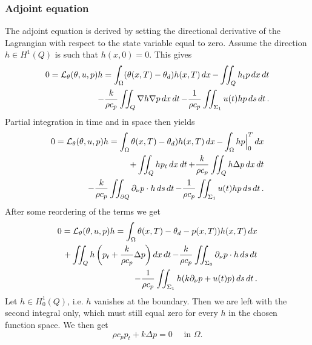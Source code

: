 \subsubsection{Adjoint equation}
The adjoint equation is derived by setting the directional derivative of the Lagrangian with respect to the state variable equal to zero. Assume the direction $h\in H^1(Q)$ is such that $h(x, 0) = 0$. %
This gives
\begin{equation}
  \begin{aligned}
  0 = \mathcal{L}_\theta(\theta, u, p)h = \int_\Omega (\theta(x,T) - \theta_d)h(x, T)\mathop{dx} - \iint_Q h_t p\mathop{dx}\mathop{dt} \\
  - \frac{k}{\rho c_p}\iint_Q\nabla h\nabla p \mathop{dx}\mathop{dt}
  - \frac{1}{\rho c_p}\iint_{\Sigma_1} u(t)h p\mathop{ds}\mathop{dt}.
  \end{aligned}
\end{equation}
Partial integration in time and in space then yields
\begin{equation} %
  \begin{aligned}
  0 = \L_\theta(\theta, u, p)h = \int_\Omega \theta(x,T) - \theta_d)h(x, T)\dx - \int_\Omega hp\Big|_0^T \dx \\
  + \iint_Q h p_t\dxdt
  + \frac{k}{\rho c_p}\iint_Q h\Delta p \dxdt \\
  - \frac{k}{\rho c_p} \iint_{\partial Q}\partial_\nu p\cdot h\dsdt
  - \frac{1}{\rho c_p}\iint_{\Sigma_1} u(t)h p\dsdt.
  \end{aligned}
\end{equation}
After some reordering of the terms we get
\begin{equation}
  \begin{aligned}
  0 = \mathcal{L}_\theta(\theta, u, p)h = \int_\Omega \theta(x,T) - \theta_d-p(x, T))h(x, T)\mathop{dx} \\
  + \iint_Q h \left( p_t + \frac{k}{\rho c_p}\Delta p\right) \mathop{dx}\mathop{dt}
   - \frac{k}{\rho c_p} \iint_{\Sigma_0}\partial_\nu p\cdot h\mathop{ds}\mathop{dt} \\
   - \frac{1}{\rho c_p} \iint_{\Sigma_1}h(  k\partial_\nu p + u(t)p )\mathop{ds}\mathop{dt}.
  \end{aligned}
\end{equation}
Let $h\in H_0^1(Q)$, i.e. $h$ vanishes at the boundary. Then we are left with the second integral only, which must still equal zero for every $h$ in the chosen function space. We then get
\begin{equation*}
  \rho c_p p_t + k\Delta p = 0 \quad\textrm{ in } \Omega.
\end{equation*}
